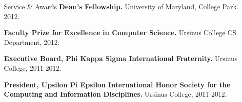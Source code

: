 \documentclass{resume} %
\begin{document}
\begin{rSection}{Service \& Awards}
\textbf{Dean's Fellowship.} University of Maryland, College Park. 2012.
\item \textbf{Faculty Prize for Excellence in Computer Science.} Ursinus College CS Department, 2012.
\item \textbf{Executive Board, Phi Kappa Sigma International Fraternity.} Ursinus College, 2011-2012.
\item \textbf{President, Upsilon Pi Epsilon International Honor Society for the Computing and Information Disciplines.} Ursinus College, 2011-2012.
\end{rSection}
\end{document}
